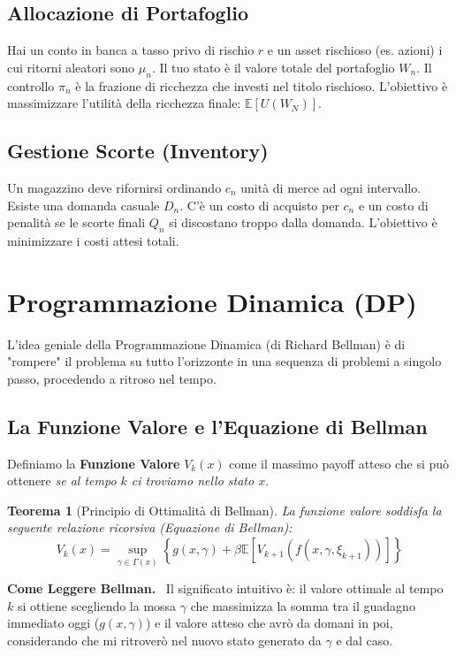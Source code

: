 \documentclass[11pt, a4paper]{report}
\theoremstyle{plain}
\newtheorem{theorem}{Teorema}[chapter]
\theoremstyle{definition}
\theoremstyle{remark}
\newenvironment{hint}[1][Hint]
{\begin{mdframed}[backgroundcolor=blue!5, linecolor=blue!50, linewidth=2pt, topline=false, rightline=false, bottomline=false]
\textbf{\textsf{#1.}}\ }
{\end{mdframed}}
\newcommand{\E}{\mathbb{E}}
\newcommand{\1}{\mathbf{1}}
\begin{document}
\subsection{Allocazione di Portafoglio}
Hai un conto in banca a tasso privo di rischio $r$ e un asset rischioso (es. azioni) i cui ritorni aleatori sono $\mu_n$. Il tuo stato è il valore totale del portafoglio $W_n$. Il controllo $\pi_n$ è la frazione di ricchezza che investi nel titolo rischioso. L'obiettivo è massimizzare l'utilità della ricchezza finale: $\E [ U(W_N) ]$.

\subsection{Gestione Scorte (Inventory)}
Un magazzino deve rifornirsi ordinando $c_n$ unità di merce ad ogni intervallo. Esiste una domanda casuale $D_n$. C'è un costo di acquisto per $c_n$ e un costo di penalità se le scorte finali $Q_n$ si discostano troppo dalla domanda. L'obiettivo è minimizzare i costi attesi totali.

\section{Programmazione Dinamica (DP)}

L'idea geniale della Programmazione Dinamica (di Richard Bellman) è di "rompere" il problema su tutto l'orizzonte in una sequenza di problemi a singolo passo, procedendo a ritroso nel tempo.

\subsection{La Funzione Valore e l'Equazione di Bellman}

Definiamo la \textbf{Funzione Valore} $V_k(x)$ come il massimo payoff atteso che si può ottenere \emph{se al tempo $k$ ci troviamo nello stato $x$}.

\begin{theorem}[Principio di Ottimalità di Bellman]
La funzione valore soddisfa la seguente relazione ricorsiva (Equazione di Bellman):
\[ V_k(x) = \sup_{\gamma \in \Gamma(x)} \left\{ g(x, \gamma) + \beta \E \left[ V_{k+1}(f(x, \gamma, \xi_{k+1})) \right] \right\} \]
\end{theorem}

\begin{hint}[Come Leggere Bellman]
Il significato intuitivo è: il valore ottimale al tempo $k$ si ottiene scegliendo la mossa $\gamma$ che massimizza la somma tra il guadagno immediato oggi ($g(x, \gamma)$) e il valore atteso che avrò da domani in poi, considerando che mi ritroverò nel nuovo stato generato da $\gamma$ e dal caso.
\end{hint}
\end{document}
